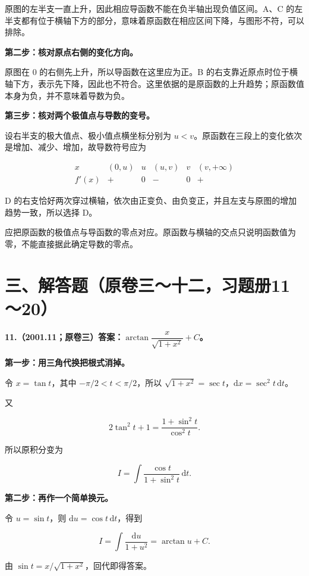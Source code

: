 \documentclass[UTF8,11pt,fontset=windows]{ctexart}
\begin{document}
原图的左半支一直上升，因此相应导函数不能在负半轴出现负值区间。A、C 的左半支都有位于横轴下方的部分，意味着原函数在相应区间下降，与图形不符，可以排除。

\textbf{第二步：核对原点右侧的变化方向。}

原图在 $0$ 的右侧先上升，所以导函数在这里应为正。B 的右支靠近原点时位于横轴下方，表示先下降，因此也不符合。这里依据的是原函数的上升趋势；原函数值本身为负，并不意味着导数为负。

\textbf{第三步：核对两个极值点与导数的变号。}

设右半支的极大值点、极小值点横坐标分别为 $u<v$。原函数在三段上的变化依次是增加、减少、增加，故导数符号应为

$$
\begin{array}{c|ccccc}
x&(0,u)&u&(u,v)&v&(v,+\infty)\\ \hline
f'(x)&+&0&-&0&+
\end{array}
$$

D 的右支恰好两次穿过横轴，依次由正变负、由负变正，并且左支与原图的增加趋势一致，所以选择 D。

应把原函数的极值点与导函数的零点对应。原函数与横轴的交点只说明函数值为零，不能直接据此确定导数的零点。

\clearpage

\section*{三、解答题（原卷三～十二，习题册11～20）}

\textbf{11.（2001.11；原卷三）答案：$\arctan\dfrac{x}{\sqrt{1+x^2}}+C$。}

\textbf{第一步：用三角代换把根式消掉。}

令 $x=\tan t$，其中 $-\pi/2<t<\pi/2$，所以 $\sqrt{1+x^2}=\sec t$，$\mathrm dx=\sec^2t\,\mathrm dt$。

又

$$
2\tan^2t+1=\frac{1+\sin^2t}{\cos^2t}.
$$

所以原积分变为

$$
I=\int\frac{\cos t}{1+\sin^2t}\,\mathrm dt.
$$

\textbf{第二步：再作一个简单换元。}

令 $u=\sin t$，则 $\mathrm du=\cos t\,\mathrm dt$，得到

$$
I=\int\frac{\mathrm du}{1+u^2}=\arctan u+C.
$$

由 $\sin t=x/\sqrt{1+x^2}$，回代即得答案。
\end{document}
